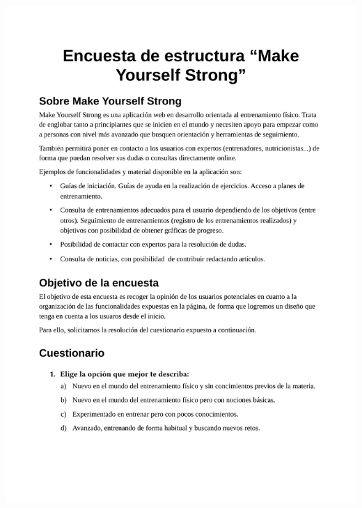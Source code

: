 \documentclass[a4paper]{article}
\begin{document}
 \includegraphics[width=\textwidth, page=1]{./figuras/encuesta.pdf}
\end{document}
